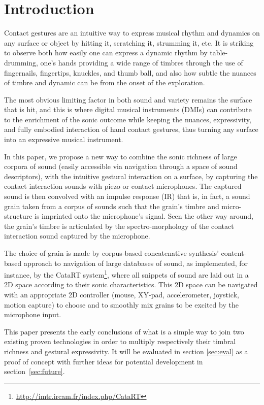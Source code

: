 \section{Introduction}


Contact gestures are an intuitive way to express musical rhythm and dynamics on any surface or object by hitting it, scratching it, strumming it, etc.  It is striking to observe both how easily one can express a dynamic rhythm by table-drumming, one's hands providing a wide range of timbres through the use of fingernails, fingertips, knuckles, and thumb ball, and also how subtle the nuances of timbre and dynamic can be from the onset of the exploration.

The most obvious limiting factor in both sound and variety remains the surface that is hit, and this is where digital musical instruments (DMIs) can contribute to the enrichment of the sonic outcome while keeping the nuances, expressivity, and fully embodied interaction of hand contact gestures, thus turning any surface into an expressive musical instrument.

In this paper, we propose a new way to combine the sonic richness of large corpora of sound (easily accessible via navigation through a space of sound descriptors), with the intuitive gestural interaction on a surface, by capturing the contact interaction sounds with piezo or contact microphones. The captured sound is then convolved with an impulse response (IR) that is, in fact, a sound grain taken from a corpus of sounds such that the grain's timbre and micro-structure is imprinted onto the microphone's signal.
Seen the other way around, the grain's timbre is articulated by the spectro-morphology of the contact interaction sound captured by the microphone. 

The choice of grain is made by corpus-based concatenative synthesis' content-based approach to navigation of large databases of sound, as implemented, for instance, by the CataRT system\footnote{\url{http://imtr.ircam.fr/index.php/CataRT}}, where all snippets of sound are laid out in a 2D space according to their sonic characteristics.  This 2D space can be navigated with an appropriate 2D controller (mouse, XY-pad, accelerometer, joystick, motion capture) to choose and to smoothly mix grains to be excited by the microphone input.

This paper presents the early conclusions of what is a simple way to join two existing proven technologies in order to multiply respectively their timbral richness and gestural expressivity. It will be evaluated in section \ref{sec:eval} as a proof of concept with further ideas for potential development in section~\ref{sec:future}.




